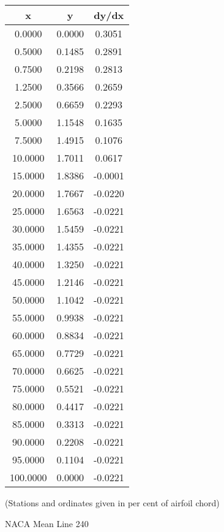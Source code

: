 \documentclass[11pt]{book}
\begin{document}
 \vspace{8mm}
 \begin{tabular}{|c|c|c|}  \hline
 x & y & dy/dx \\
 \hline
0.0000 & 0.0000 & 0.3051 \\
0.5000 & 0.1485 & 0.2891 \\
0.7500 & 0.2198 & 0.2813 \\
1.2500 & 0.3566 & 0.2659 \\
2.5000 & 0.6659 & 0.2293 \\
5.0000 & 1.1548 & 0.1635 \\
7.5000 & 1.4915 & 0.1076 \\
10.0000 & 1.7011 & 0.0617 \\
15.0000 & 1.8386 & -0.0001 \\
20.0000 & 1.7667 & -0.0220 \\
25.0000 & 1.6563 & -0.0221 \\
30.0000 & 1.5459 & -0.0221 \\
35.0000 & 1.4355 & -0.0221 \\
40.0000 & 1.3250 & -0.0221 \\
45.0000 & 1.2146 & -0.0221 \\
50.0000 & 1.1042 & -0.0221 \\
55.0000 & 0.9938 & -0.0221 \\
60.0000 & 0.8834 & -0.0221 \\
65.0000 & 0.7729 & -0.0221 \\
70.0000 & 0.6625 & -0.0221 \\
75.0000 & 0.5521 & -0.0221 \\
80.0000 & 0.4417 & -0.0221 \\
85.0000 & 0.3313 & -0.0221 \\
90.0000 & 0.2208 & -0.0221 \\
95.0000 & 0.1104 & -0.0221 \\
100.0000 & 0.0000 & -0.0221 \\
 \hline
 \end{tabular}
 \vspace{8mm}

(Stations and ordinates given in per cent of airfoil chord)

 \newpage
 \label{ml240}
 \begin{Large}
 NACA Mean Line 240
 \end{Large}
  
\end{document}
